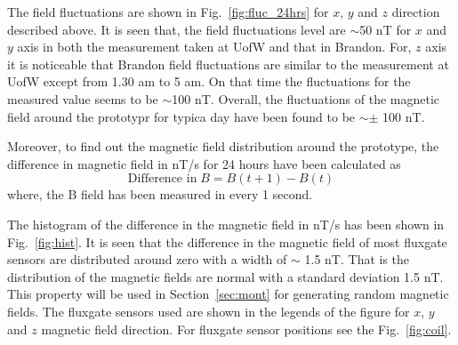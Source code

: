 
The field fluctuations are shown in Fig.~\ref{fig:fluc_24hrs} for $x$, $y$ and $z$ direction described above. It is seen that, the field fluctuations level are $\sim$50 nT for $x$ and $y$ axis in both the measurement taken at UofW and that in Brandon. For, $z$ axis it is noticeable that Brandon field fluctuations are similar to the measurement at UofW except from 1.30 am to 5 am. On that time the fluctuations for the measured value seems to be $\sim$100 nT. Overall, the fluctuations of the magnetic field around the prototypr for typica day have been found to be $\sim \pm$ 100 nT.



Moreover, to find out the magnetic field distribution around the prototype, the difference in magnetic field in nT/s for 24 hours have been calculated as 
\begin{equation}
    \text{Difference in}\;B=B(t+1)-B(t)
\end{equation}
where, the B field has been measured in every 1 second.

The histogram of the difference in the magnetic field in nT/s has been shown in Fig.~\ref{fig:hist}. It is seen that the difference in the magnetic field of most fluxgate sensors are distributed around zero with a width of $\sim$ 1.5 nT. That is the distribution of the magnetic fields are normal with a standard deviation 1.5 nT. This property will be used in Section~\ref{sec:mont} for generating random magnetic fields. The fluxgate sensors used are shown in the legends of the figure for $x$, $y$ and $z$ magnetic field direction. For fluxgate sensor positions see the Fig.~\ref{fig:coil}.


